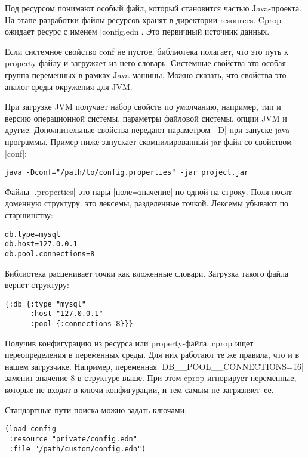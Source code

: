 Под ресурсом понимают особый файл, который становится частью Java-проекта. На
этапе разработки файлы ресурсов хранят в директории resources. Cprop ожидает
ресурс с именем \spverb|config.edn|. Это первичный источник данных.

Если системное свойство conf не пустое, библиотека полагает, что это путь к
property-файлу и загружает из него словарь. Системные свойства это особая группа
переменных в рамках Java-машины. Можно сказать, что свойства это аналог среды
окружения для JVM.

При загрузке JVM получает набор свойств по умолчанию, например, тип и версию
операционной системы, параметры файловой системы, опции JVM и
другие. Дополнительные свойства передают параметром \spverb|-D| при запуске
java-программы. Пример ниже запускает скомпилированный jar-файл со свойством
\spverb|conf|:

\begin{verbatim}
java -Dconf="/path/to/config.properties" -jar project.jar
\end{verbatim}

Файлы \spverb|.properties| это пары \spverb|поле=значение| по одной на строку. Поля носят
доменную структуру: это лексемы, разделенные точкой. Лексемы убывают по
старшинству:

\begin{verbatim}
db.type=mysql
db.host=127.0.0.1
db.pool.connections=8
\end{verbatim}

Библиотека расценивает точки как вложенные словари. Загрузка такого файла вернет
структуру:

\begin{verbatim}
{:db {:type "mysql"
      :host "127.0.0.1"
      :pool {:connections 8}}}
\end{verbatim}

Получив конфигурацию из ресурса или property-файла, cprop ищет переопределения в
переменных среды. Для них работают те же правила, что и в нашем
загрузчике. Например, переменная \spverb|DB__POOL__CONNECTIONS=16| заменит
значение 8 в структуре выше. При этом cprop игнорирует переменные, которые не
входят в ключи конфигурации, и тем самым не загрязняет~ее.

Стандартные пути поиска можно задать ключами:

\begin{verbatim}
(load-config
 :resource "private/config.edn"
 :file "/path/custom/config.edn")
\end{verbatim}

